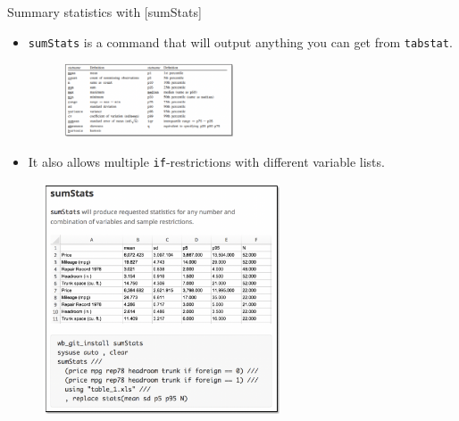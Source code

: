 \documentclass[aspectratio=169]{beamer}
\begin{document}
\begin{frame}{Summary statistics with [sumStats]}
	\begin{multicols}{2}	
		
		\begin{itemize}[<default overlay specification>]
			\item<1> \texttt{sumStats} is a command that will output anything you can get from \texttt{tabstat}.
			
			\begin{figure}
				\centering
				\includegraphics[width=50mm]{img/Table4}
			\end{figure}
			
			\item<1> It also allows multiple \texttt{if}-restrictions with different variable lists.
		\end{itemize}
		
		\begin{figure}
			\centering
			\includegraphics[width=70mm]{img/Table5}
		\end{figure}
		
	\end{multicols}
\end{frame}
\end{document}

